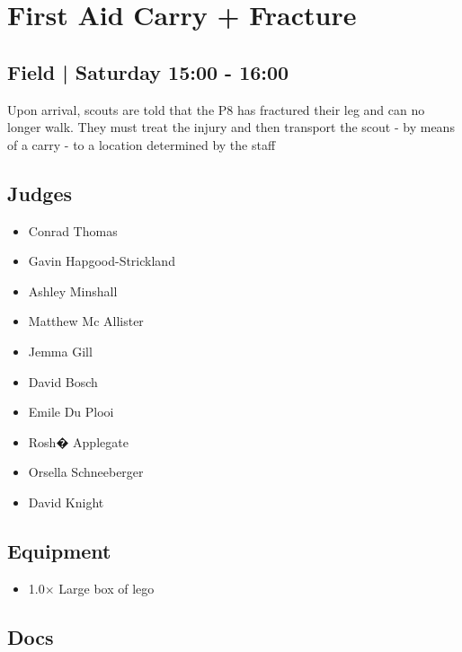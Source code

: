 \documentclass[10pt]{article}
\begin{document}
		\begin{minipage}{\linewidth}
		\setcounter{section}{9}
	\section{First Aid Carry + Fracture }
	\subsection*{Field | Saturday 15:00 - 16:00}

	Upon arrival, scouts are told that the P8 has fractured their leg and can no longer walk. They must treat the injury and then transport the scout - by means of a carry - to a location determined by the staff

	\begin{multicols}{2}
	\subsection*{\faUsers \: Judges}
	\begin{itemize}
			\item Conrad Thomas
			\item Gavin Hapgood-Strickland
			\item Ashley Minshall
			\item Matthew Mc Allister
			\item Jemma Gill
			\item David Bosch
			\item Emile Du Plooi
			\item Rosh� Applegate
			\item Orsella Schneeberger
			\item David Knight
		\end{itemize}
	\columnbreak
	\subsection*{\faWrench \: Equipment}
	
        \begin{itemize}
                    \item 1.0$\times$ \: Large box of lego
                \end{itemize}
                \vfill\null
        \subsection*{\faFile \: Docs}
     	\end{multicols}


	\vspace{1cm}
	\end{minipage}
\end{document}
